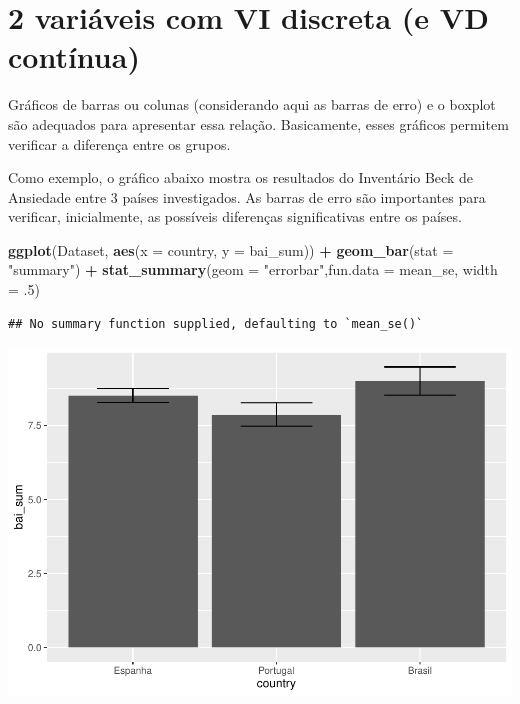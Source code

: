 \documentclass[
]{book}
\newenvironment{Shaded}{\begin{snugshade}}{\end{snugshade}}
\newcommand{\DataTypeTok}[1]{\textcolor[rgb]{0.13,0.29,0.53}{#1}}
\newcommand{\FloatTok}[1]{\textcolor[rgb]{0.00,0.00,0.81}{#1}}
\newcommand{\KeywordTok}[1]{\textcolor[rgb]{0.13,0.29,0.53}{\textbf{#1}}}
\newcommand{\NormalTok}[1]{#1}
\newcommand{\OperatorTok}[1]{\textcolor[rgb]{0.81,0.36,0.00}{\textbf{#1}}}
\newcommand{\StringTok}[1]{\textcolor[rgb]{0.31,0.60,0.02}{#1}}
\begin{document}
\hypertarget{variuxe1veis-com-vi-discreta-e-vd-contuxednua}{%
\section{2 variáveis com VI discreta (e VD contínua)}\label{variuxe1veis-com-vi-discreta-e-vd-contuxednua}}

Gráficos de barras ou colunas (considerando aqui as barras de erro) e o boxplot são adequados para apresentar essa relação. Basicamente, esses gráficos permitem verificar a diferença entre os grupos.

Como exemplo, o gráfico abaixo mostra os resultados do Inventário Beck de Ansiedade entre 3 países investigados. As barras de erro são importantes para verificar, inicialmente, as possíveis diferenças significativas entre os países.

\begin{Shaded}
\begin{Highlighting}[]
\KeywordTok{ggplot}\NormalTok{(Dataset, }\KeywordTok{aes}\NormalTok{(}\DataTypeTok{x =}\NormalTok{ country, }\DataTypeTok{y =}\NormalTok{ bai_sum)) }\OperatorTok{+}
\StringTok{  }\KeywordTok{geom_bar}\NormalTok{(}\DataTypeTok{stat =} \StringTok{"summary"}\NormalTok{) }\OperatorTok{+}
\StringTok{  }\KeywordTok{stat_summary}\NormalTok{(}\DataTypeTok{geom =} \StringTok{"errorbar"}\NormalTok{,}\DataTypeTok{fun.data =}\NormalTok{ mean_se, }\DataTypeTok{width =} \FloatTok{.5}\NormalTok{) }
\end{Highlighting}
\end{Shaded}

\begin{verbatim}
## No summary function supplied, defaulting to `mean_se()`
\end{verbatim}

\begin{center}\includegraphics{gitbook-demo_files/figure-latex/unnamed-chunk-20-1} \end{center}
\end{document}
